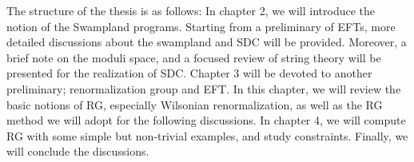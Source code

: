 \indent The structure of the thesis is as follows: In chapter 2, we will introduce the notion of the Swampland programs. Starting from a preliminary of EFTs, more detailed discussions about the swampland and SDC will be provided. Moreover, a brief note on the moduli space, and a focused review of string theory will be presented for the realization of SDC. Chapter 3 will be devoted to another preliminary; renormalization group and EFT. In this chapter, we will review the basic notions of RG, especially Wilsonian renormalization, as well as the RG method we will adopt for the following discussions. In chapter 4, we will compute RG with some simple but non-trivial examples, and study constraints. Finally, we will conclude the discussions. 